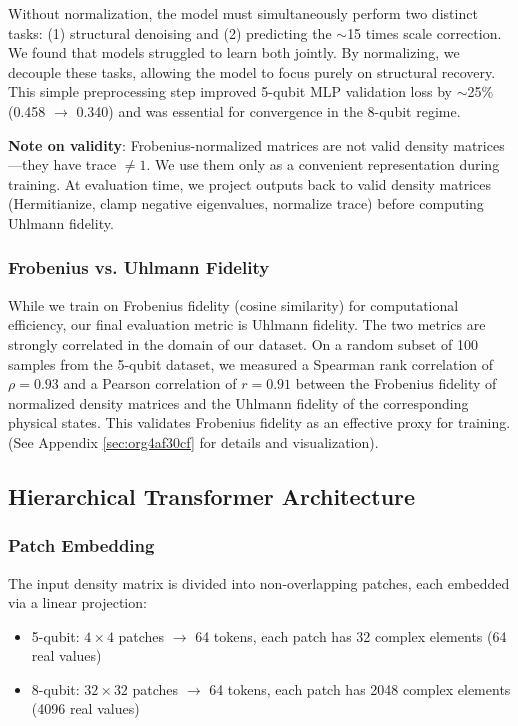 \documentclass[11pt]{article}
\begin{document}
Without normalization, the model must simultaneously perform two distinct tasks: (1) structural denoising and (2) predicting the \(\sim\)15 times scale correction. We found that models struggled to learn both jointly. By normalizing, we decouple these tasks, allowing the model to focus purely on structural recovery. This simple preprocessing step improved 5-qubit MLP validation loss by \(\sim\)25\% (0.458 \(\to\) 0.340) and was essential for convergence in the 8-qubit regime.

\textbf{Note on validity}: Frobenius-normalized matrices are not valid density matrices---they have trace \(\neq 1\). We use them only as a convenient representation during training. At evaluation time, we project outputs back to valid density matrices (Hermitianize, clamp negative eigenvalues, normalize trace) before computing Uhlmann fidelity.

\subsubsection{Frobenius vs. Uhlmann Fidelity}
\label{sec:org9e53cc4}

While we train on Frobenius fidelity (cosine similarity) for computational efficiency, our final evaluation metric is Uhlmann fidelity. The two metrics are strongly correlated in the domain of our dataset. On a random subset of 100 samples from the 5-qubit dataset, we measured a Spearman rank correlation of \(\rho = 0.93\) and a Pearson correlation of \(r = 0.91\) between the Frobenius fidelity of normalized density matrices and the Uhlmann fidelity of the corresponding physical states. This validates Frobenius fidelity as an effective proxy for training. (See Appendix \ref{sec:org4af30cf} for details and visualization).


\subsection{Hierarchical Transformer Architecture}
\label{sec:org0b45ab6}

\subsubsection{Patch Embedding}
\label{sec:orgabf9eaa}

The input density matrix is divided into non-overlapping patches, each embedded via a linear projection:

\begin{itemize}
\item 5-qubit: \(4\times 4\) patches \(\to\) 64 tokens, each patch has 32 complex elements (64 real values)
\item 8-qubit: \(32\times 32\) patches \(\to\) 64 tokens, each patch has 2048 complex elements (4096 real values)
\end{itemize}
\end{document}
